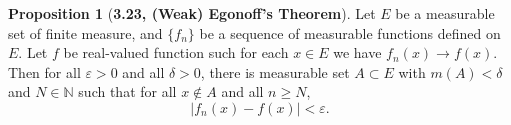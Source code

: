 \documentclass[12pt]{article}
\newcommand{\N}{\mathbb{N}}
\renewcommand{\epsilon}{\varepsilon}
\theoremstyle{definition}
\newtheorem*{prop}{Proposition}
\begin{document}
\begin{prop}[\textbf{3.23, (Weak) Egonoff's Theorem}]

    Let \( E \) be a measurable set of finite measure, and \( \{ f_n \} \) be a sequence of measurable functions defined on \( E \). Let \( f \) be real-valued function such for each \( x \in E \) we have \( f_n(x) \to f(x) \). Then for all \( \epsilon > 0 \) and all \( \delta > 0 \), there is measurable set \( A \subset E \) with \( m(A) < \delta \) and \( N \in \N \) such that for all \( x \not\in A \) and all \( n \geq N\),
        \[
            |f_n(x) - f(x)| < \epsilon.    
        \]
    
\end{prop}
\end{document}
